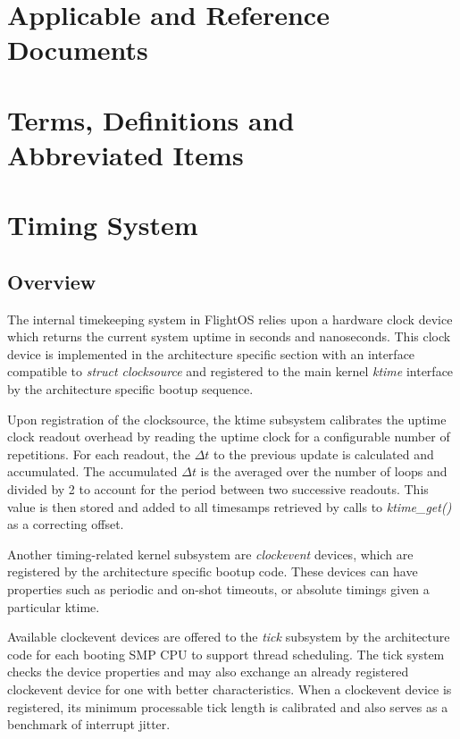 \chapter{Applicable and Reference Documents} %

\printbibliography[heading=none]


\chapter{Terms, Definitions and Abbreviated Items}


\chapter{Timing System}\label{chap:timing}

\section{Overview}

The internal timekeeping system in FlightOS relies upon a hardware
clock device which returns the current system uptime in seconds and nanoseconds.
This clock device is implemented in the architecture specific section with
an interface compatible to \emph{struct clocksource} and registered to
the main kernel \emph{ktime} interface by the architecture specific
bootup sequence.

Upon registration of the clocksource, the ktime subsystem calibrates the
uptime clock readout overhead by reading the uptime clock for a configurable
number of repetitions. For each readout, the $\Delta t$ to the previous
update is calculated and accumulated. The accumulated $\Delta t$ is the
averaged over the number of loops and divided by 2 to account for the
period between two successive readouts. This value is then stored and
added to all timesamps retrieved by calls to \emph{ktime\_get()} as a
correcting offset.

Another timing-related kernel subsystem are \emph{clockevent} devices,
which are registered by the architecture specific bootup code. These devices
can have properties such as periodic and on-shot timeouts, or absolute timings
given a particular ktime.

Available clockevent devices are offered to the \emph{tick} subsystem by the 
architecture code for each booting SMP CPU to support thread scheduling. The
tick system checks the device properties and may also exchange an already
registered clockevent device for one with better characteristics. When a
clockevent device is registered, its minimum processable tick length
is calibrated and also serves as a benchmark of interrupt jitter.



